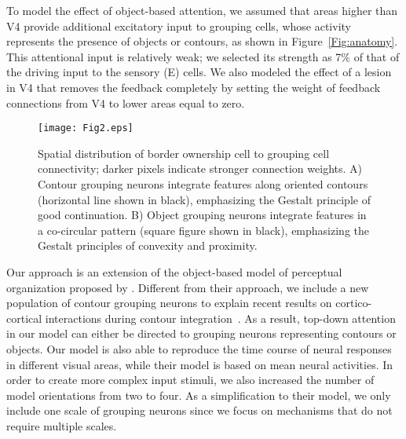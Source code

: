 To model the effect of
 object-based
% 
attention, we assumed that areas higher
than V4 provide additional excitatory input to grouping cells, whose
activity represents the presence of objects or contours,
 as shown in Figure~\ref{Fig:anatomy}. This attentional input is
 relatively weak; 
we selected its strength as 7\% of that of the driving input to the
sensory (E) cells. We also modeled the effect of a lesion in V4 that removes the feedback completely by setting the weight of feedback connections from V4 to lower areas equal to zero.

\begin{figure*}
\begin{center}
\texttt{[image: Fig2.eps]}
\end{center}
\caption{Spatial distribution of border ownership cell to grouping
  cell connectivity; darker pixels indicate stronger connection
  weights. A) Contour grouping neurons integrate features along
  oriented contours (horizontal line shown in black), emphasizing the
  Gestalt principle of good continuation. B) Object grouping neurons
  integrate features in a co-circular pattern (square figure shown in
  black), emphasizing the Gestalt principles of convexity and
  proximity.} 
\label{Fig:BG_projections}
\end{figure*}

Our approach is an extension of the 
object-based model of perceptual organization proposed by
\cite{Mihalas_etal11b}. Different from their approach, we include a new population of contour grouping neurons to explain recent results on cortico-cortical interactions during contour integration~\citep{Chen_etal14}. As a result, top-down attention in our model can either be directed to grouping neurons representing contours or objects. Our model is also able to reproduce the time course of neural responses in different visual areas, while their model is based on mean neural activities. In order to create more complex input stimuli, we also increased the number of model orientations from two to four. As a simplification to their model, we only include one scale of grouping neurons since we focus on mechanisms that do not require multiple scales. 

